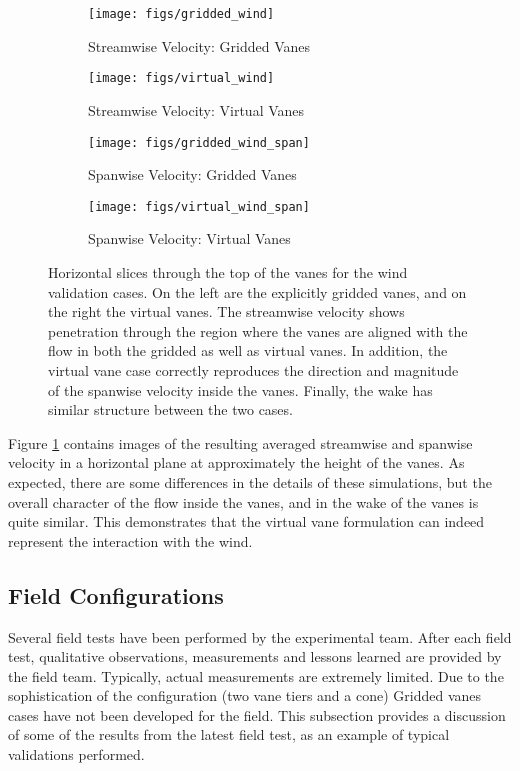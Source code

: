 \begin{figure}[htb]

 \begin{subfigure}{.5\textwidth}
  \centering
  \texttt{[image: figs/gridded\_wind]}
  \caption{Streamwise Velocity: Gridded Vanes}
 \end{subfigure}%
 \begin{subfigure}{.5\textwidth}
  \centering
  \texttt{[image: figs/virtual\_wind]}
  \caption{Streamwise Velocity: Virtual Vanes}
 \end{subfigure}%


 \begin{subfigure}{.5\textwidth}
  \centering
  \texttt{[image: figs/gridded\_wind\_span]}
  \caption{Spanwise Velocity: Gridded Vanes}
 \end{subfigure}%
 \begin{subfigure}{.5\textwidth}
  \centering
  \texttt{[image: figs/virtual\_wind\_span]}
  \caption{Spanwise Velocity: Virtual Vanes}
 \end{subfigure}%

 \caption{Horizontal slices through the top of the vanes for the
 wind validation cases. On the left are the explicitly gridded vanes,
 and on the right the virtual vanes. The streamwise velocity shows
 penetration through the region where the vanes are aligned with the
 flow in both the gridded as well as virtual vanes. In addition, the
 virtual vane case correctly reproduces the direction and magnitude of
 the spanwise velocity inside the vanes. Finally, the wake has similar
 structure between the two cases.}
 \label{fig:wind_val}
\end{figure}

Figure \ref{fig:wind_val} contains images of the resulting averaged
streamwise and  spanwise velocity in a horizontal plane at approximately
the height of the vanes. As expected, there are some differences in the
details of these simulations, but the overall character of the flow
inside the vanes, and in the wake of the vanes is quite similar. This
demonstrates that the virtual vane formulation can indeed represent the
interaction with the wind. 

\subsection{Field Configurations}

Several field tests have been performed by the experimental team. After
each field test, qualitative observations, measurements and lessons
learned are provided by the field team. Typically, actual measurements
are extremely limited. Due to the sophistication of the configuration
(two vane tiers and a cone) Gridded vanes cases have not been developed
for the field. This subsection provides a discussion of some of
the results from the latest field test, as an example of typical
validations performed. 

